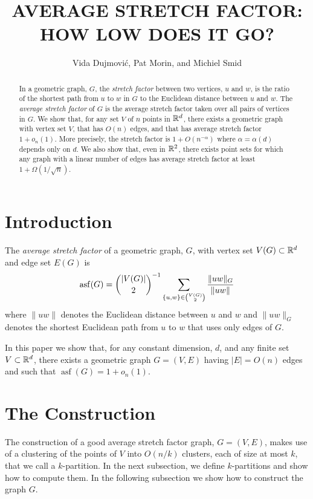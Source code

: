 \documentclass{patmorin}
\title{\MakeUppercase{Average Stretch Factor: How Low Does It Go?}}
\author{Vida Dujmovi\'c, Pat Morin, and Michiel Smid}
\DeclareMathOperator{\asf}{asf}
\begin{document}
\begin{titlepage}
\maketitle

\begin{abstract}
  In a geometric graph, $G$, the \emph{stretch factor} between two
  vertices, $u$ and $w$, is the ratio of the shortest path from $u$ to $w$
  in $G$ to the Euclidean distance between $u$ and $w$.  The \emph{average
  stretch factor} of $G$ is the average stretch factor taken over all
  pairs of vertices in $G$.  We show that, for any set $V$ of $n$ points
  in $\mathbb{R}^d$, there exists a geometric graph with vertex set $V$, that
  has $O(n)$ edges, and that has average stretch factor $1+ o_n(1)$.
  More precisely, the stretch factor is $1+O(n^{-\alpha})$ where
  $\alpha=\alpha(d)$ depends only on $d$.  We also show that, even in
  $\mathbb{R}^2$, there exists point sets for which any graph with a linear number
  of edges has average stretch factor at least $1+\Omega(1/\sqrt{n})$.
\end{abstract}

\end{titlepage}

\section{Introduction}

The \emph{average stretch factor} of a geometric graph, $G$, with vertex
set $V(G)\subset \mathbb{R}^d$ and edge set $E(G)$ is
\[
    \asf(G) = \binom{|V(G)|}{2}^{-1}\sum_{\{u,w\}\in\binom{V(G)}{2}}\frac{\|uw\|_G}{\|uw\|} \eqlabel{asf}
\]
where $\|uw\|$ denotes the Euclidean distance between $u$ and $w$
and $\|uw\|_G$ denotes the shortest Euclidean path from $u$ to $w$
that uses only edges of $G$.

In this paper we show that, for any constant dimension, $d$, and any
finite set $V\subset \mathbb{R}^d$, there exists a geometric graph $G=(V,E)$
having $|E|=O(n)$ edges and such that $\asf(G)=1+o_n(1)$.

\section{The Construction}

The construction of a good average stretch factor graph, $G=(V,E)$,
makes use of a clustering of the points of $V$ into $O(n/k)$ clusters,
each of size at most $k$, that we call a $k$-partition.  In the next
subsection, we define $k$-partitions and show how to compute them.
In the following subsection we show how to construct the graph $G$.
\end{document}
